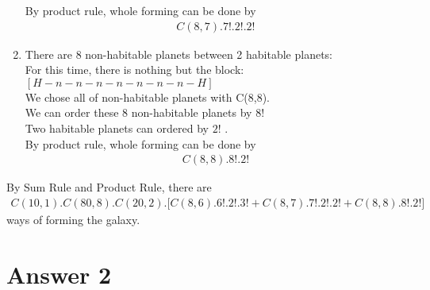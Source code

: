 \documentclass[11pt]{article}
\begin{document}
\begin{enumerate}
            \hspace*{5mm} By product rule, whole forming can be done by
            \begin{gather*}
                C(8,7).7!.2!.2!
            \end{gather*}
        \item There are 8 non-habitable planets between 2 habitable planets:\\
            \hspace*{5mm} For this time, there is nothing but the block:\\
            \hspace*{10mm} $[H-n-n-n-n-n-n-n-H]$\\
            \hspace*{5mm} We chose all of non-habitable planets with C(8,8).\\
            \hspace*{5mm} We can order these 8 non-habitable planets by $8!$\\
            \hspace*{5mm} Two habitable planets can ordered by $2!$ .\\
            \hspace*{5mm} By product rule, whole forming can be done by
            \begin{gather*}
                C(8,8).8!.2!
            \end{gather*}
    \end{enumerate}
        
        
    By Sum Rule and Product Rule, there are
    \begin{gather*}
        C(10,1).C(80,8).C(20,2). \Big[C(8,6).6!.2!.3! + C(8,7).7!.2!.2! + C(8,8).8!.2! \Big]
    \end{gather*}
    ways of forming the galaxy.
    
\newpage

\section*{Answer 2}
\end{document}

